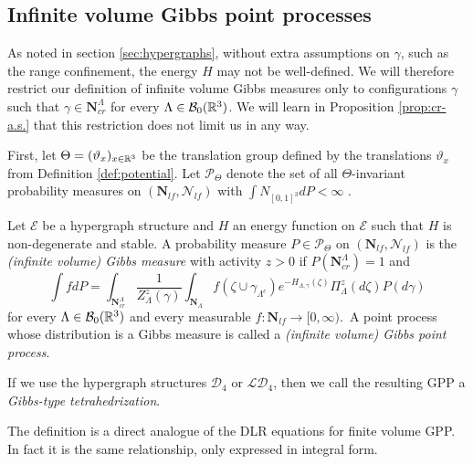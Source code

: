 

\subsection{Infinite volume Gibbs point processes}
As noted in section \ref{sec:hypergraphs}, without extra assumptions on $\gamma$, such as the range confinement, the energy $H$ may not be well-defined. We will therefore restrict our definition of infinite volume Gibbs measures only to configurations $\gamma$ such that $\gamma \in \mathbf N^\Lambda_{cr}$ for every $\Lambda \in \mathcal B_0({\mathbb R^3})$. We will learn in Proposition \ref{prop:cr-a.s.} that this restriction does not limit us in any way.

First, let $\Theta=(\vartheta_x)_{x\in {\mathbb R^3}}$ be the translation group defined by the translations $\vartheta_x$ from Definition \ref{def:potential}. Let $\mathcal P_\Theta$ denote the set of all $\Theta$-invariant probability measures on $(\mathbf N_{lf},\mathcal N_{lf})$ with $\int N_{[0,1]^3} dP< \infty $ . 

\begin{definition}\label{def:GPP}
	Let $\mathcal E$ be a hypergraph structure and $H$ an energy function on $\mathcal E$ such that $H$ is non-degenerate and stable. A probability measure $P\in \mathcal P_\Theta$ on $(\mathbf N_{lf},\mathcal N_{lf})$ is the \textit{(infinite volume) Gibbs measure} with activity $z>0$ if $P(\mathbf N^\Lambda_{cr})=1$ and
	\begin{equation}\label{eq:DLR}
		\int f dP = \int_{\mathbf N^\Lambda_{cr}} \frac 1 {Z^z_{\Lambda}(\gamma)} \int_{\mathbf N_\Lambda} f(\zeta \cup \gamma_{\Lambda^c}) e^{-H_{\Lambda,\gamma}(\zeta)} \Pi^z_\Lambda (d\zeta) P(d\gamma)
	\end{equation}
		for every $\Lambda \in \mathcal B_0({\mathbb R^3})$ and every measurable $f:\mathbf N_{lf} \to [0,\infty)$.\
		A point process whose distribution is a Gibbs measure is called a \textit{(infinite volume) Gibbs point process}.
\end{definition}
If we use the hypergraph structures $\mathcal D_4$ or $\mathcal {LD}_4$, then we call the resulting GPP a \textit{Gibbs-type tetrahedrization}. 

The definition is a direct analogue of the DLR equations for finite volume GPP. In fact it is the same relationship, only expressed in integral form.  \newline

